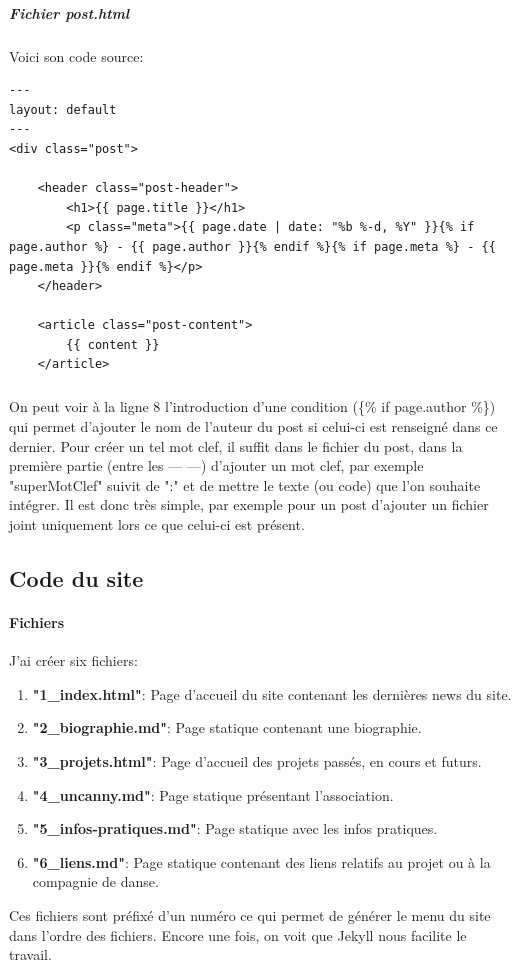 \documentclass[11pt,a4paper]{report}
\begin{document}
				\subparagraph{Fichier post.html}Voici son code source:
					\lstset{caption=Fichier "post.html" généré par JekyllRB, language=HTML}
					\begin{lstlisting}
---
layout: default
---
<div class="post">

	<header class="post-header">
		<h1>{{ page.title }}</h1>
		<p class="meta">{{ page.date | date: "%b %-d, %Y" }}{% if page.author %} - {{ page.author }}{% endif %}{% if page.meta %} - {{ page.meta }}{% endif %}</p>
	</header>

	<article class="post-content">
		{{ content }}
	</article>
					\end{lstlisting}
				\subparagraph*{}On peut voir à la ligne 8 l'introduction d'une condition (\{\% if page.author \%\}) qui permet d'ajouter le nom de l'auteur du post si celui-ci est renseigné dans ce dernier. Pour créer un tel mot clef, il suffit dans le fichier du post, dans la première partie (entre les --- ---) d'ajouter un mot clef, par exemple "superMotClef" suivit de ":" et de mettre le texte (ou code) que l'on souhaite intégrer. Il est donc très simple, par exemple pour un post d'ajouter un fichier joint uniquement lors ce que celui-ci est présent.

		\subsection{Code du site}
			\paragraph{Fichiers}J'ai créer six fichiers:
				\begin{enumerate}
					\item \textbf{"1\_index.html"}:			Page d'accueil du site contenant les dernières news du site.
					\item \textbf{"2\_biographie.md"}: 		Page statique contenant une biographie.
					\item \textbf{"3\_projets.html"}:		Page d'accueil des projets passés, en cours et futurs.
					\item \textbf{"4\_uncanny.md"}:			Page statique présentant l'association.
					\item \textbf{"5\_infos-pratiques.md"}:	Page statique avec les infos pratiques.
					\item \textbf{"6\_liens.md"}:			Page statique contenant des liens relatifs au projet ou à la compagnie de danse.
				\end{enumerate}
			Ces fichiers sont préfixé d'un numéro ce qui permet de générer le menu du site dans l'ordre des fichiers. Encore une fois, on voit que Jekyll nous facilite le travail.
\end{document}
